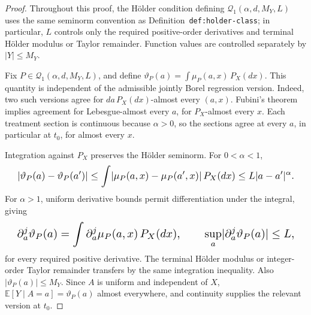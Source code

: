 \documentclass{article}
\begin{document}
\begin{proof}
Throughout this proof, the H\"older condition defining \(\mathcal Q_1(\alpha,d,M_Y,L)\) uses the same seminorm convention as Definition~\texttt{def:holder-class}; in particular, \(L\) controls only the required positive-order derivatives and terminal H\"older modulus or Taylor remainder. Function values are controlled separately by \(\lvert Y\rvert\le M_Y\).

Fix \(P\in\mathcal Q_1(\alpha,d,M_Y,L)\), and define \(\vartheta_P(a)=\int\mu_P(a,x)\,P_X(dx)\). This quantity is independent of the admissible jointly Borel regression version. Indeed, two such versions agree for \(da\,P_X(dx)\)-almost every \((a,x)\). Fubini's theorem implies agreement for Lebesgue-almost every \(a\), for \(P_X\)-almost every \(x\). Each treatment section is continuous because \(\alpha>0\), so the sections agree at every \(a\), in particular at \(t_0\), for almost every \(x\).

Integration against \(P_X\) preserves the H\"older seminorm. For \(0<\alpha<1\),
\[
\makebox[\linewidth][c]{\resizebox{0.98\linewidth}{!}{\par\noindent \makebox[\linewidth][c]{\resizebox{0.98\linewidth}{!}{\(\displaystyle \displaystyle \lvert\vartheta_P(a)-\vartheta_P(a')\rvert\le\int\lvert\mu_P(a,x)-\mu_P(a',x)\rvert\,P_X(dx)\le L\lvert a-a'\rvert^\alpha.\)}}\par\noindent}}
\]
For \(\alpha>1\), uniform derivative bounds permit differentiation under the integral, giving
\[
\makebox[\linewidth][c]{\resizebox{0.98\linewidth}{!}{\par\noindent \makebox[\linewidth][c]{\resizebox{0.98\linewidth}{!}{\(\displaystyle \displaystyle \partial_a^j\vartheta_P(a)=\int\partial_a^j\mu_P(a,x)\,P_X(dx),\qquad \sup_a\lvert\partial_a^j\vartheta_P(a)\rvert\le L,\)}}\par\noindent}}
\]
for every required positive derivative. The terminal H\"older modulus or integer-order Taylor remainder transfers by the same integration inequality. Also \(\lvert\vartheta_P(a)\rvert\le M_Y\). Since \(A\) is uniform and independent of \(X\), \(\mathbb E[Y\mid A=a]=\vartheta_P(a)\) almost everywhere, and continuity supplies the relevant version at \(t_0\).


\end{proof}
\end{document}
